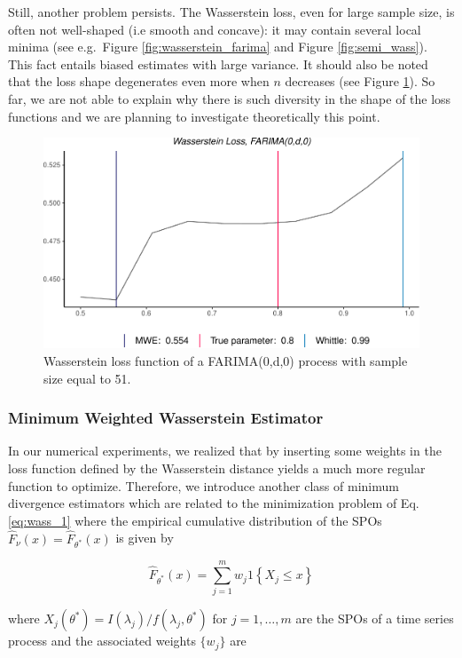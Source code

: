 \documentclass[
  11pt,
]{article}
\begin{document}
Still, another problem persists. The Wasserstein loss, even for large
sample size, is often not well-shaped (i.e smooth and concave): it may
contain several local minima (see e.g.~Figure
\ref{fig:wasserstein_farima} and Figure \ref{fig:semi_wass}). This fact
entails biased estimates with large variance. It should also be noted
that the loss shape degenerates even more when \(n\) decreases (see
Figure \ref{fig:small_sample}). So far, we are not able to explain why
there is such diversity in the shape of the loss functions and we are
planning to investigate theoretically this point.

\begin{figure}

{\centering \includegraphics[width=0.5\linewidth]{Master_thesis_V4_files/figure-latex/small_sample-1} 

}

\caption{Wasserstein loss function of a FARIMA(0,d,0) process with sample size equal to 51.}\label{fig:small_sample}
\end{figure}

\hypertarget{minimum-weighted-wasserstein-estimator}{%
\subsubsection{Minimum Weighted Wasserstein
Estimator}\label{minimum-weighted-wasserstein-estimator}}

In our numerical experiments, we realized that by inserting some weights
in the loss function defined by the Wasserstein distance yields a much
more regular function to optimize. Therefore, we introduce another class
of minimum divergence estimators which are related to the minimization
problem of Eq. \ref{eq:wass_1} where the empirical cumulative
distribution of the SPOs \(\hat F_\nu(x) = \hat F_{\theta^*}(x)\) is
given by

\[\hat F_{\theta^*}(x)=\sum_{j=1}^{m} w_{j} 1\left\{X_{j} \leq x\right\}\]

where
\(X_{j}\left(\theta^{*}\right)=I\left(\lambda_{j}\right) / f\left(\lambda_{j}, \theta^{*}\right)\)
for \(j=1, \ldots, m\) are the SPOs of a time series process and the
associated weights \(\{w_j\}\) are
\end{document}
